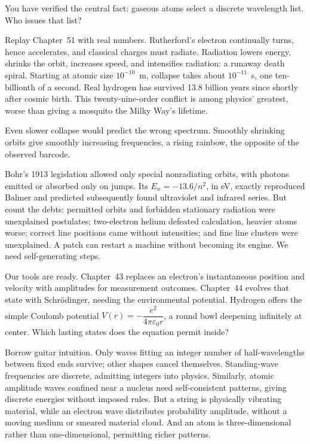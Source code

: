 You have verified the central fact: gaseous atoms select a discrete wavelength list. Who issues that list?


Replay Chapter~51 with real numbers. Rutherford's electron continually turns, hence accelerates, and classical charges must radiate. Radiation lowers energy, shrinks the orbit, increases speed, and intensifies radiation: a runaway death spiral. Starting at atomic size \(10^{-10}\)~m, collapse takes about \(10^{-11}\)~s, one ten-billionth of a second. Real hydrogen has survived 13.8 billion years since shortly after cosmic birth. This twenty-nine-order conflict is among physics' greatest, worse than giving a mosquito the Milky Way's lifetime.

Even slower collapse would predict the wrong spectrum. Smoothly shrinking orbits give smoothly increasing frequencies, a rising rainbow, the opposite of the observed barcode.

Bohr's 1913 legislation allowed only special nonradiating orbits, with photons emitted or absorbed only on jumps. Its \(E_n=-13.6/n^2\), in eV, exactly reproduced Balmer and predicted subsequently found ultraviolet and infrared series. But count the debts: permitted orbits and forbidden stationary radiation were unexplained postulates; two-electron helium defeated calculation, heavier atoms worse; correct line positions came without intensities; and fine line clusters were unexplained. A patch can restart a machine without becoming its engine. We need self-generating steps.


Our tools are ready. Chapter~43 replaces an electron's instantaneous position and velocity with amplitudes for measurement outcomes. Chapter~44 evolves that state with Schrödinger, needing the environmental potential. Hydrogen offers the simple Coulomb potential \(V(r)=-\dfrac{e^2}{4\pi\varepsilon_0 r}\), a round bowl deepening infinitely at center. Which lasting states does the equation permit inside?

Borrow guitar intuition. Only waves fitting an integer number of half-wavelengths between fixed ends survive; other shapes cancel themselves. Standing-wave frequencies are discrete, admitting integers into physics. Similarly, atomic amplitude waves confined near a nucleus need self-consistent patterns, giving discrete energies without imposed rules. But a string is physically vibrating material, while an electron wave distributes probability amplitude, without a moving medium or smeared material cloud. And an atom is three-dimensional rather than one-dimensional, permitting richer patterns.

